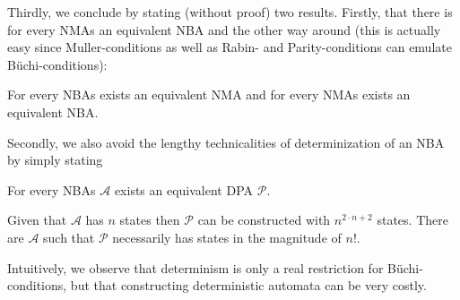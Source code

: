 Thirdly, we conclude by stating (without proof) two results. Firstly, that
there is for every \acp{NMA} an equivalent \ac{NBA} and the other way around
(this is actually easy since Muller-conditions as well as Rabin- and
Parity-conditions can emulate Büchi-conditions):
\begin{theorem}
  \cite[Theorem 1.10]{AutoLogInfGames}
  For every \acp{NBA} exists an equivalent \ac{NMA} and for every \acp{NMA}
  exists an equivalent \ac{NBA}.
\end{theorem}
Secondly, we also avoid the lengthy technicalities of determinization of an
\ac{NBA} by simply stating
\begin{theorem}
  \cite[Theorem 3.6]{AutoLogInfGames}
  \cite[Section 3.2]{NonDetBuechiToDetParity}
  \cite[Theorem 6]{OptBoundsAutoTrans}
  For every \acp{NBA} $\mathcal{A}$ exists an equivalent \ac{DPA}
  $\mathcal{P}$.

  Given that $\mathcal{A}$ has $n$ states then $\mathcal{P}$ can be
  constructed with $n^{2\cdot n + 2}$ states. There are $\mathcal{A}$
  such that $\mathcal{P}$ necessarily has states in the magnitude of $n!$.
\end{theorem}
Intuitively, we observe that determinism is only a real restriction for
Büchi-conditions, but that constructing deterministic automata can be very
costly.

